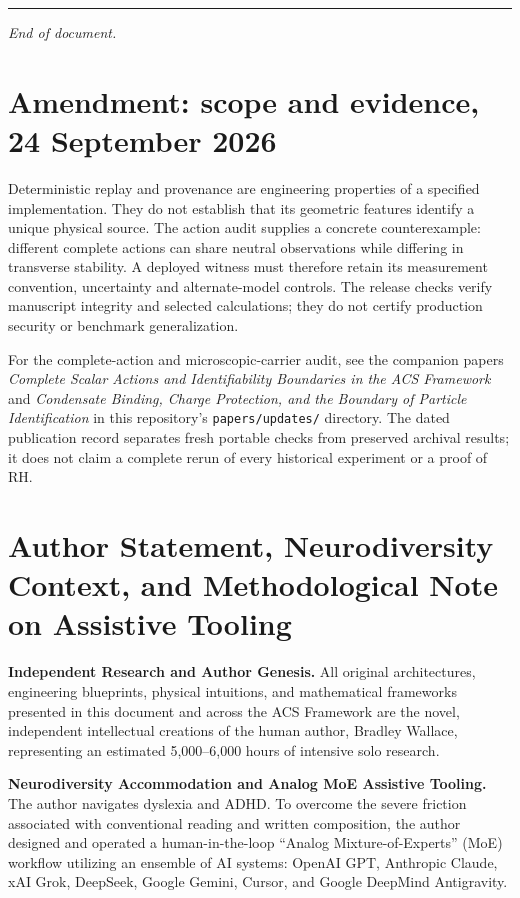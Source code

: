 \documentclass[11pt,a4paper]{article}
\begin{document}
\begin{center}\rule{0.5\linewidth}{0.5pt}\end{center}

\emph{End of document.}


\section*{Amendment: scope and evidence, 24 September 2026}
Deterministic replay and provenance are engineering properties of a specified implementation. They do not establish that its geometric features identify a unique physical source. The action audit supplies a concrete counterexample: different complete actions can share neutral observations while differing in transverse stability. A deployed witness must therefore retain its measurement convention, uncertainty and alternate-model controls. The release checks verify manuscript integrity and selected calculations; they do not certify production security or benchmark generalization.

For the complete-action and microscopic-carrier audit, see the companion
papers \emph{Complete Scalar Actions and Identifiability Boundaries in the ACS
Framework} and \emph{Condensate Binding, Charge Protection, and the Boundary
of Particle Identification} in this repository's \texttt{papers/updates/}
directory. The dated publication record separates fresh portable checks
from preserved archival results; it does not claim a complete rerun of every
historical experiment or a proof of RH.

\section*{Author Statement, Neurodiversity Context, and Methodological Note on Assistive Tooling}
\noindent\textbf{Independent Research and Author Genesis.} 
All original architectures, engineering blueprints, physical intuitions, and mathematical frameworks presented in this document and across the ACS Framework are the novel, independent intellectual creations of the human author, Bradley Wallace, representing an estimated 5,000--6,000 hours of intensive solo research.

\vspace{0.5em}
\noindent\textbf{Neurodiversity Accommodation and Analog MoE Assistive Tooling.}
The author navigates dyslexia and ADHD. To overcome the severe friction associated with conventional reading and written composition, the author designed and operated a human-in-the-loop ``Analog Mixture-of-Experts'' (MoE) workflow utilizing an ensemble of AI systems: OpenAI GPT, Anthropic Claude, xAI Grok, DeepSeek, Google Gemini, Cursor, and Google DeepMind Antigravity.
\end{document}
